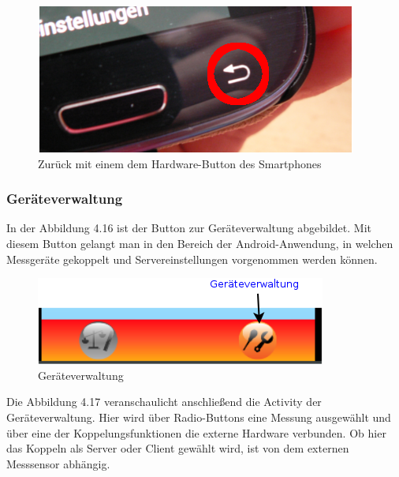 \begin{figure}[h]
  \centering
  \includegraphics[scale=0.5]{screenshots/kapitel4/gui/hd_backbtn.png}
  \caption{Zur\"uck mit einem dem Hardware-Button des Smartphones}
  
\end{figure}

\subsubsection{Ger\"ateverwaltung}

In der Abbildung 4.16 ist der Button zur Ger\"ateverwaltung abgebildet.
Mit diesem Button gelangt man in den Bereich der Android-Anwendung, in welchen 
Messger\"ate gekoppelt und Servereinstellungen vorgenommen werden k\"onnen.

\begin{figure}[h]
  \centering
  \includegraphics[scale=0.5]{screenshots/kapitel6/android/devices.png}
  \caption{Ger\"ateverwaltung}
  
\end{figure}

Die Abbildung 4.17 veranschaulicht anschlie\ss{}end die Activity der Ger\"ateverwaltung.
Hier wird \"uber Radio-Buttons eine Messung ausgew\"ahlt und \"uber eine der Koppelungsfunktionen
die externe Hardware verbunden.
Ob hier das Koppeln als Server oder Client gew\"ahlt wird, ist von dem externen Messsensor abh\"angig.\\

